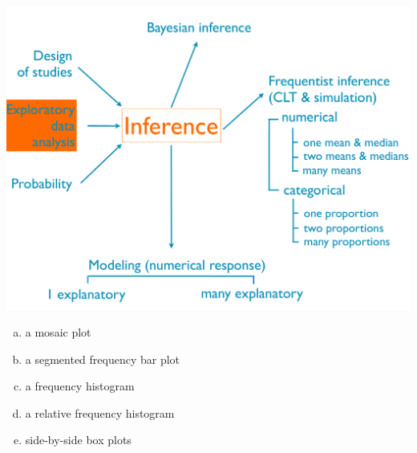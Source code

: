 \documentclass[11pt,containsverbatim,handout,xcolor=xelatex,dvipsnames,table]{beamer}
\newcommand{\solnMult}[1]{#1}
\begin{document}
\begin{frame}

{
{\scriptsize
{}}}
{
 \includegraphics[width=\textwidth]{figures/map/eda}
}

\vfill

{\footnotesize
\begin{enumerate}[(a)]
\item a mosaic plot
\item a segmented frequency bar plot
\item a frequency histogram
\item a relative frequency histogram
\item \solnMult{side-by-side box plots}
\end{enumerate}
}

\end{frame}

\end{document}
